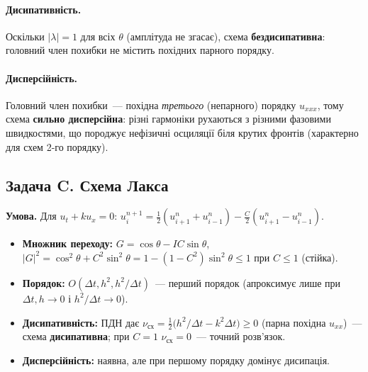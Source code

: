 \documentclass[12pt,a4paper]{article}
\theoremstyle{definition}
\theoremstyle{plain}
\newcommand{\abs}[1]{\left\lvert #1 \right\rvert}
\begin{document}
\paragraph{Дисипативність.} Оскільки $\abs{\lambda}=1$ для всіх $\theta$
(амплітуда не згасає), схема \textbf{бездисипативна}: головний член
похибки не містить похідних парного порядку.

\paragraph{Дисперсійність.} Головний член похибки~--- похідна
\emph{третього} (непарного) порядку $u_{xxx}$, тому схема
\textbf{сильно дисперсійна}: різні гармоніки рухаються з різними фазовими
швидкостями, що породжує нефізичні осциляції біля крутих фронтів
(характерно для схем 2-го порядку).

\subsection{Задача C. Схема Лакса}
\textbf{Умова.} Для $u_t+k u_x=0$:
$u_i^{n+1}=\tfrac12(u_{i+1}^n+u_{i-1}^n)-\tfrac{C}{2}(u_{i+1}^n-u_{i-1}^n)$.
\begin{itemize}[leftmargin=1.4em]
  \item \textbf{Множник переходу:} $G=\cos\theta-IC\sin\theta$,
  $\abs{G}^2=\cos^2\theta+C^2\sin^2\theta=1-(1-C^2)\sin^2\theta\le1$ при
  $C\le1$ (стійка).
  \item \textbf{Порядок:} $O(\Delta t,h^2,h^2/\Delta t)$~--- перший порядок
  (апроксимує лише при $\Delta t,h\to0$ і $h^2/\Delta t\to0$).
  \item \textbf{Дисипативність:} ПДН дає
  $\nu_{\text{сх}}=\tfrac12\big(h^2/\Delta t-k^2\Delta t\big)\ge0$ (парна
  похідна $u_{xx}$)~--- схема \textbf{дисипативна}; при $C=1$
  $\nu_{\text{сх}}=0$~--- точний розв'язок.
  \item \textbf{Дисперсійність:} наявна, але при першому порядку домінує
  дисипація.
\end{itemize}
\end{document}
